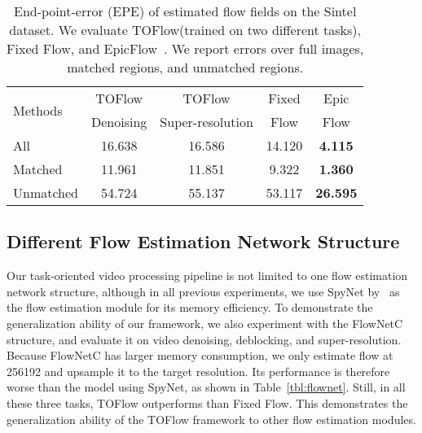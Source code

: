 \documentclass[twocolumn,natbib]{svjour3}          \smartqed  \usepackage{graphicx}
\newcommand{\tbl}[1]{Table~\ref{#1}}
\def\toflow{TOFlow\xspace}
\def\fflow{Fixed Flow\xspace}
\def\epicflow{EpicFlow\xspace}
\begin{document}
\begin{table}[t]
\centering
\small
\vspace{-4pt}\begin{tabular}{lcccc}
    \toprule
    \multirow{2}{*}{Methods} & \toflow & \toflow & Fixed & Epic\\
    & Denoising & Super-resolution & Flow & Flow \\
    \midrule
    All & 16.638 & 16.586 & 14.120 & \textbf{4.115} \\
    Matched & 11.961 & 11.851 & 9.322 & \textbf{1.360}	\\
    Unmatched & 54.724 & 55.137 & 53.117 & \textbf{26.595} \\
    \bottomrule
\end{tabular}
\caption{End-point-error (EPE) of estimated flow fields on the Sintel dataset. We evaluate \toflow (trained on two different tasks), \fflow, and \epicflow~\citep{Revaud2015Epicflow}. We report errors over full images, matched regions, and unmatched regions.}
\label{tbl:sintel}
\end{table}

 
\subsection{Different Flow Estimation Network Structure}

Our task-oriented video processing pipeline is not limited to one flow estimation network structure, although in all previous experiments, we use SpyNet by~\cite{Ranjan2017Optical} as the flow estimation module for its memory efficiency. To demonstrate the generalization ability of our framework, we also experiment with the FlowNetC~\citep{Fischer2015Flownet:} structure, and evaluate it on video denoising, deblocking, and super-resolution. Because FlowNetC has larger memory consumption, we only estimate flow at 256192 and upsample it to the target resolution. Its performance is therefore worse than the model using SpyNet, as shown in \tbl{tbl:flownet}. Still, in all these three tasks, \toflow outperforms than \fflow. This demonstrates the generalization ability of the \toflow framework to other flow estimation modules.
\end{document}
